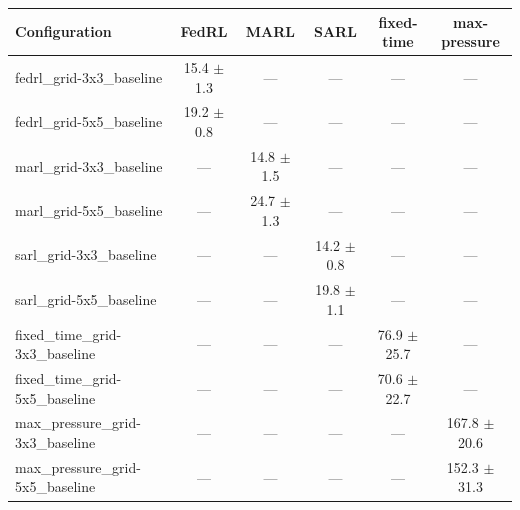 \begin{tabular}{lccccc}
\toprule
Configuration & FedRL & MARL & SARL & fixed-time & max-pressure \\
\midrule
fedrl_grid-3x3_baseline & 15.4 $\pm$ 1.3 & --- & --- & --- & --- \\
fedrl_grid-5x5_baseline & 19.2 $\pm$ 0.8 & --- & --- & --- & --- \\
marl_grid-3x3_baseline & --- & 14.8 $\pm$ 1.5 & --- & --- & --- \\
marl_grid-5x5_baseline & --- & 24.7 $\pm$ 1.3 & --- & --- & --- \\
sarl_grid-3x3_baseline & --- & --- & 14.2 $\pm$ 0.8 & --- & --- \\
sarl_grid-5x5_baseline & --- & --- & 19.8 $\pm$ 1.1 & --- & --- \\
fixed_time_grid-3x3_baseline & --- & --- & --- & 76.9 $\pm$ 25.7 & --- \\
fixed_time_grid-5x5_baseline & --- & --- & --- & 70.6 $\pm$ 22.7 & --- \\
max_pressure_grid-3x3_baseline & --- & --- & --- & --- & 167.8 $\pm$ 20.6 \\
max_pressure_grid-5x5_baseline & --- & --- & --- & --- & 152.3 $\pm$ 31.3 \\
\bottomrule
\end{tabular}
